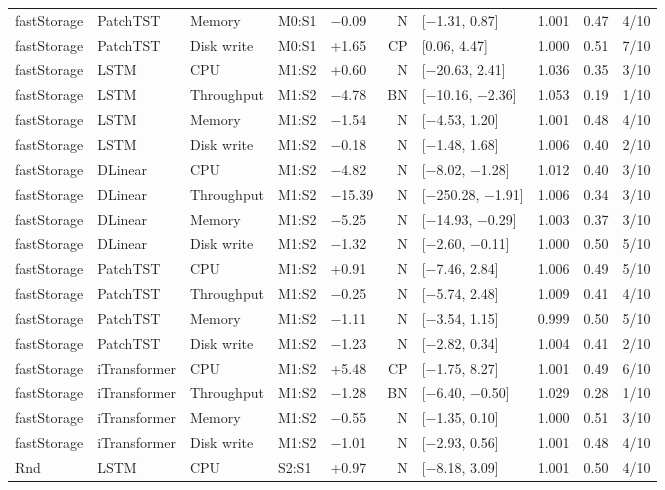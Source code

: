 \begin{longtable}{@{}lllllrlrrr@{}}
fastStorage & PatchTST & Memory & M0:S1 & $-$0.09 & N & [$-$1.31, 0.87] & 1.001 & 0.47 & 4/10 \\
fastStorage & PatchTST & Disk write & M0:S1 & +1.65 & CP & [0.06, 4.47] & 1.000 & 0.51 & 7/10 \\
fastStorage & LSTM & CPU & M1:S2 & +0.60 & N & [$-$20.63, 2.41] & 1.036 & 0.35 & 3/10 \\
fastStorage & LSTM & Throughput & M1:S2 & $-$4.78 & BN & [$-$10.16, $-$2.36] & 1.053 & 0.19 & 1/10 \\
fastStorage & LSTM & Memory & M1:S2 & $-$1.54 & N & [$-$4.53, 1.20] & 1.001 & 0.48 & 4/10 \\
fastStorage & LSTM & Disk write & M1:S2 & $-$0.18 & N & [$-$1.48, 1.68] & 1.006 & 0.40 & 2/10 \\
fastStorage & DLinear & CPU & M1:S2 & $-$4.82 & N & [$-$8.02, $-$1.28] & 1.012 & 0.40 & 3/10 \\
fastStorage & DLinear & Throughput & M1:S2 & $-$15.39 & N & [$-$250.28, $-$1.91] & 1.006 & 0.34 & 3/10 \\
fastStorage & DLinear & Memory & M1:S2 & $-$5.25 & N & [$-$14.93, $-$0.29] & 1.003 & 0.37 & 3/10 \\
fastStorage & DLinear & Disk write & M1:S2 & $-$1.32 & N & [$-$2.60, $-$0.11] & 1.000 & 0.50 & 5/10 \\
fastStorage & PatchTST & CPU & M1:S2 & +0.91 & N & [$-$7.46, 2.84] & 1.006 & 0.49 & 5/10 \\
fastStorage & PatchTST & Throughput & M1:S2 & $-$0.25 & N & [$-$5.74, 2.48] & 1.009 & 0.41 & 4/10 \\
fastStorage & PatchTST & Memory & M1:S2 & $-$1.11 & N & [$-$3.54, 1.15] & 0.999 & 0.50 & 5/10 \\
fastStorage & PatchTST & Disk write & M1:S2 & $-$1.23 & N & [$-$2.82, 0.34] & 1.004 & 0.41 & 2/10 \\
fastStorage & iTransformer & CPU & M1:S2 & +5.48 & CP & [$-$1.75, 8.27] & 1.001 & 0.49 & 6/10 \\
fastStorage & iTransformer & Throughput & M1:S2 & $-$1.28 & BN & [$-$6.40, $-$0.50] & 1.029 & 0.28 & 1/10 \\
fastStorage & iTransformer & Memory & M1:S2 & $-$0.55 & N & [$-$1.35, 0.10] & 1.000 & 0.51 & 3/10 \\
fastStorage & iTransformer & Disk write & M1:S2 & $-$1.01 & N & [$-$2.93, 0.56] & 1.001 & 0.48 & 4/10 \\
Rnd & LSTM & CPU & S2:S1 & +0.97 & N & [$-$8.18, 3.09] & 1.001 & 0.50 & 4/10 \\

\end{longtable}

